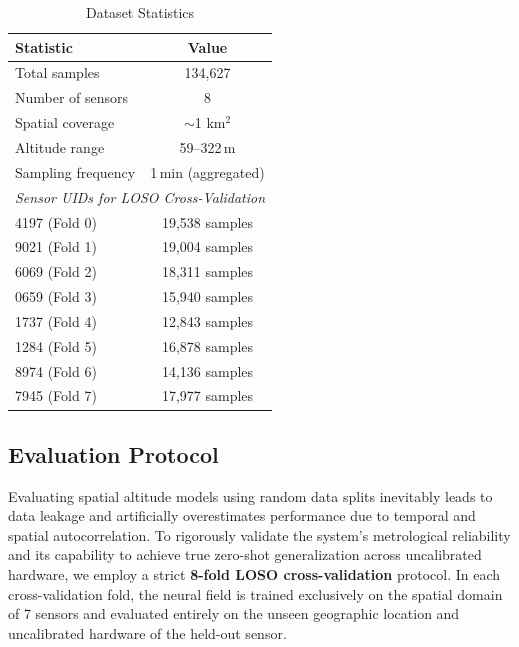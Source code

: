 \begin{table}[t]
\caption{Dataset Statistics}
\label{tab:dataset}
\centering
\begin{tabular}{lc}
\toprule
\textbf{Statistic} & \textbf{Value} \\
\midrule
Total samples & 134,627 \\
Number of sensors & 8 \\
Spatial coverage & $\sim$1 km$^2$ \\
Altitude range & 59--322\,m \\
Sampling frequency & 1\,min (aggregated) \\
\midrule
\multicolumn{2}{c}{\textit{Sensor UIDs for LOSO Cross-Validation}} \\
\midrule
4197 (Fold 0) & 19,538 samples \\
9021 (Fold 1) & 19,004 samples \\
6069 (Fold 2) & 18,311 samples \\
0659 (Fold 3) & 15,940 samples \\
1737 (Fold 4) & 12,843 samples \\
1284 (Fold 5) & 16,878 samples \\
8974 (Fold 6) & 14,136 samples \\
7945 (Fold 7) & 17,977 samples \\
\bottomrule
\end{tabular}
\end{table}


\subsection{Evaluation Protocol}
\label{subsec:eval_protocol}

Evaluating spatial altitude models using random data splits inevitably leads to data leakage and artificially overestimates performance due to temporal and spatial autocorrelation. To rigorously validate the system's metrological reliability and its capability to achieve true zero-shot generalization across uncalibrated hardware, we employ a strict \textbf{8-fold LOSO cross-validation} protocol. In each cross-validation fold, the neural field is trained exclusively on the spatial domain of 7 sensors and evaluated entirely on the unseen geographic location and uncalibrated hardware of the held-out sensor.

